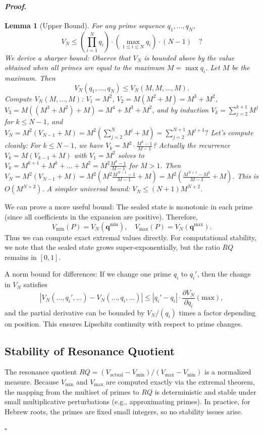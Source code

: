 \documentclass[12pt]{article}
\theoremstyle{plain}
\newtheorem{lemma}[theorem]{Lemma}
\theoremstyle{definition}
\theoremstyle{remark}
\renewenvironment{proof}{\paragraph{\textit{Proof}.}}{\hfill$\square$}
\begin{document}
\begin{proof}
\begin{lemma}[Upper Bound]
For any prime sequence $q_1,\dots,q_N$,
\[
V_N \le \left(\prod_{i=1}^{N} q_i\right) \cdot \left(\max_{1\le i\le N} q_i\right) \cdot (N-1) \quad \text{?}
\]
We derive a sharper bound: Observe that $V_N$ is bounded above by the value obtained when all primes are equal to the maximum $M = \max q_i$. Let $M$ be the maximum. Then 
\[
V_N(q_1,\dots,q_N) \le V_N(M,M,\dots,M).
\]
Compute $V_N(M,\dots,M)$: 
$V_1=M^2$, $V_2 = M(M^2+M)=M^3+M^2$, $V_3 = M((M^3+M^2)+M)=M^4+M^3+M^2$, and by induction $V_k = \sum_{j=2}^{k+1} M^j$ for $k\le N-1$, and $V_N = M^2(V_{N-1}+M) = M^2\left(\sum_{j=2}^{N} M^j + M\right) = \sum_{j=2}^{N+1} M^{j+1}?$ Let's compute cleanly: For $k\le N-1$, we have $V_k = M^2 \cdot \frac{M^k-1}{M-1}$? Actually the recurrence $V_k = M(V_{k-1}+M)$ with $V_1=M^2$ solves to $V_k = M^{k+1} + M^k + \dots + M^2 = M^2\frac{M^k-1}{M-1}$ for $M>1$. Then $V_N = M^2(V_{N-1}+M) = M^2\left(M^2\frac{M^{N-1}-1}{M-1}+M\right) = M^2\left(\frac{M^{N+1}-M^2}{M-1}+M\right)$. This is $O(M^{N+2})$. A simpler universal bound: $V_N \le (N+1)M^{N+2}$.
\end{lemma}

We can prove a more useful bound: The sealed state is monotonic in each prime (since all coefficients in the expansion are positive). Therefore,
\[
V_{\min}(P) = V_N(\mathbf{q}^{\min}), \quad V_{\max}(P)=V_N(\mathbf{q}^{\max}).
\]
Thus we can compute exact extremal values directly. For computational stability, we note that the sealed state grows super-exponentially, but the ratio $RQ$ remains in $[0,1]$.

A norm bound for differences: If we change one prime $q_i$ to $q_i'$, then the change in $V_N$ satisfies
\[
|V_N(\dots,q_i',\dots)-V_N(\dots,q_i,\dots)| \le |q_i'-q_i| \cdot \frac{\partial V_N}{\partial q_i}(\text{max}),
\]
and the partial derivative can be bounded by $V_N/(q_i)$ times a factor depending on position. This ensures Lipschitz continuity with respect to prime changes.

\subsection{Stability of Resonance Quotient}

The resonance quotient $RQ = (V_{\text{actual}}-V_{\min})/(V_{\max}-V_{\min})$ is a normalized measure. Because $V_{\min}$ and $V_{\max}$ are computed exactly via the extremal theorem, the mapping from the multiset of primes to $RQ$ is deterministic and stable under small multiplicative perturbations (e.g., approximating primes). In practice, for Hebrew roots, the primes are fixed small integers, so no stability issues arise.


\end{proof}
\end{document}
